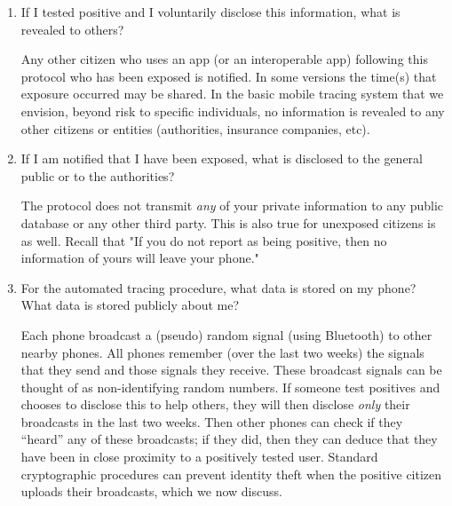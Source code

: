 \documentclass{article}
\newcommand{\TODO}[1]{ {\color{blue} #1 }}
\begin{document}
\begin{enumerate}[leftmargin=*]
\item If I tested positive and I voluntarily disclose this information, what is revealed to others?

Any other citizen who uses an app (or an interoperable app) following this protocol who has been exposed is notified. In some versions the time(s) that exposure occurred may be shared.  In the basic mobile tracing system that we envision, beyond risk to specific individuals, no information is revealed to any other citizens or entities (authorities, insurance companies, etc). 

\item If I am notified that I have been exposed, what is disclosed to the general public or to the authorities? 
 
The protocol does not transmit \emph{any} of your private information to any public database or any other third party. This is also true for unexposed citizens is as well. Recall that "If you do not report as being positive, then no information of yours will leave your phone."

\item For the automated tracing procedure, what data is stored on my phone? What data is stored publicly about me?

Each phone broadcast a (pseudo) random signal (using Bluetooth) to other nearby phones. All phones remember (over the last two weeks) the signals that they send and those signals they receive. These broadcast signals can be thought of as non-identifying random numbers. 
If someone test positives and chooses to disclose this to help others, they will then disclose \emph{only} their broadcasts in the last two weeks. Then other phones can check if they ``heard'' any of these broadcasts; if they did, then they can deduce that they have been in close proximity to a positively tested user.  Standard cryptographic procedures can prevent identity theft when the positive citizen uploads their broadcasts, which we now discuss.

\iffalse
\item Is any of my location information ever broadcast to the world?

No location information ever leaves your phone in the mobile-tracing protocol.  This one advantage of this particular Bluetooth beaconing based approach.   One could design GPS-centric approaches to mobile-tracing. Here, all individuals geo-location information would have to leave their phones; the approach would have to heavily rely on secure cryptography for privacy.
\fi

\end{enumerate}
\end{document}
